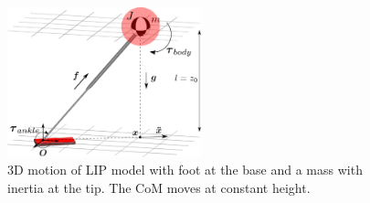 \begin{figure}[h]
\centering
\includegraphics[width=0.5\textwidth]{STYLESTUFF/3DCoMfootinertiaz0.png}
\caption{\ac{3D} motion of \ac{LIP} model with foot at the base and a mass with inertia at the tip. The \ac{CoM} moves at constant height.}
\label{fig:3dlipfootinertiaz0}
\end{figure}




